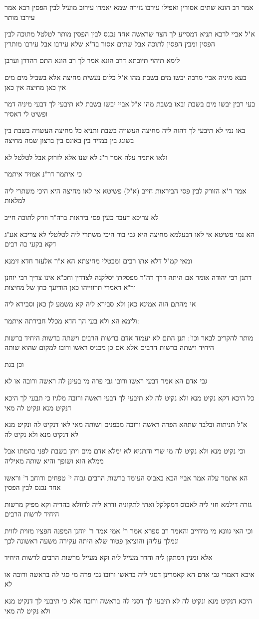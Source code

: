 \documentclass[12pt, openany]{book}
\newcommand{\sethebfont}{
\fontsize{10.5pt}{21.0pt} \selectfont
}
\newcommand{\textblock}[1]{
{\sethebfont #1\\}	
}
\begin{document}
\textblock{אמר רב הונא שתים אסורין ואפילו עירבו גזירה שמא יאמרו עירוב מועיל לבין הפסין רבא אמר עירבו מותר}
\textblock{א"ל אביי לרבא תניא דמסייע לך חצר שראשה אחד נכנס לבין הפסין מותר לטלטל מתוכה לבין הפסין ומבין הפסין לתוכה אבל שתים אסור בד"א שלא עירבו אבל עירבו מותרין}
\textblock{לימא תיהוי תיובתא דרב הונא אמר לך רב הונא התם דהדרן וערבן}
\textblock{בעא מיניה אביי מרבה יבשו מים בשבת מהו א"ל כלום נעשית מחיצה אלא בשביל מים מים אין כאן מחיצה אין כאן}
\textblock{בעי רבין יבשו מים בשבת ובאו בשבת מהו א"ל אביי יבשו בשבת לא תיבעי לך דבעי מיניה דמר ופשיט לי דאסיר}
\textblock{באו נמי לא תיבעי לך דהוה ליה מחיצה העשויה בשבת ותניא כל מחיצה העשויה בשבת בין בשוגג בין במזיד בין באונס בין ברצון שמה מחיצה}
\textblock{ולאו אתמר עלה אמר ר"נ לא שנו אלא לזרוק אבל לטלטל לא}
\textblock{כי איתמר דר"נ אמזיד איתמר}
\textblock{אמר ר"א הזורק לבין פסי הביראות חייב (א"ל) פשיטא אי לאו מחיצה היא היכי משתרי ליה למלאות}
\textblock{לא צריכא דעבד כעין פסי ביראות ברה"ר וזרק לתוכה חייב}
\textblock{הא נמי פשיטא אי לאו דבעלמא מחיצה היא גבי בור היכי משתרי ליה לטלטלי לא צריכא אע"ג דקא בקעי בה רבים}
\textblock{ומאי קמ"ל דלא אתו רבים ומבטלי מחיצתא הא א"ר אלעזר חדא זימנא}
\textblock{דתנן רבי יהודה אומר אם היתה דרך רה"ר מפסקתן יסלקנה לצדדין וחכ"א אינו צריך רבי יוחנן ור"א דאמרי תרווייהו כאן הודיעך כחן של מחיצות}
\textblock{אי מהתם הוה אמינא כאן ולא סבירא ליה קא משמע לן כאן וסבירא ליה}
\textblock{ולימא הא ולא בעי הך חדא מכלל חבירתה איתמר:}
\textblock{מותר להקריב לבאר וכו': תנן התם לא יעמוד אדם ברשות הרבים וישתה ברשות היחיד ברשות היחיד וישתה ברשות הרבים אלא אם כן מכניס ראשו ורובו למקום שהוא שותה}
\textblock{וכן בגת}
\textblock{גבי אדם הא אמר דבעי ראשו ורובו גבי פרה מי בעינן לה ראשה ורובה או לא}
\textblock{כל היכא דקא נקיט מנא ולא נקיט לה לא תיבעי לך דבעי ראשה ורובה מלגיו כי תבעי לך היכא דנקיט מנא ונקיט לה מאי}
\textblock{א"ל תניתוה ובלבד שתהא הפרה ראשה ורובה מבפנים ושותה מאי לאו דנקיט לה ונקיט מנא לא דנקיט מנא ולא נקיט לה}
\textblock{וכי נקיט מנא ולא נקיט לה מי שרי והתניא לא ימלא אדם מים ויתן בשבת לפני בהמתו אבל ממלא הוא ושופך והיא שותה מאיליה}
\textblock{הא אתמר עלה אמר אביי הכא באבוס העומד ברשות הרבים גבוה י' טפחים ורוחב ד' וראשו אחד נכנס לבין הפסין}
\textblock{גזרה דילמא חזי ליה לאבוס דמקלקל ואתי לתקוניה ודרא ליה לדוולא בהדיה וקא מפיק מרשות היחיד לרשות הרבים}
\textblock{וכי האי גוונא מי מיחייב והאמר רב ספרא אמר ר' אמי אמר ר' יוחנן המפנה חפציו מזוית לזוית ונמלך עליהן והוציאן פטור שלא היתה עקירה משעה ראשונה לכך}
\textblock{אלא זמנין דמתקן ליה והדר מעייל ליה וקא מעייל מרשות הרבים לרשות היחיד}
\textblock{איכא דאמרי גבי אדם הא קאמרינן דסגי ליה בראשו ורובו גבי פרה מי סגי לה בראשה ורובה או לא}
\textblock{היכא דנקיט מנא ונקיט לה לא תיבעי לך דסגי לה בראשה ורובה אלא כי תיבעי לך דנקיט מנא ולא נקיט לה מאי}
\end{document}
